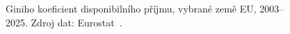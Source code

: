 \def\strEuGiniPrijemTitle{Giniho koeficient příjmové nerovnosti}%
\def\strEuGiniPrijemYlabel{Giniho koeficient [0--100]}%
\def\strEuGiniPrijemCaption{Giniho koeficient disponibilního příjmu, vybrané země \acs{EU}, 2003--2025. Zdroj dat: Eurostat~\cite{eurostat_ilc_di12_Gini}.}%
%

\providecommand\NudgeEuGiniPrijemCz{0pt}%
\providecommand\NudgeEuGiniPrijemAt{-4pt}%
\providecommand\NudgeEuGiniPrijemDe{0pt}%
\providecommand\NudgeEuGiniPrijemDk{0pt}%
\providecommand\NudgeEuGiniPrijemPl{1pt}%
\providecommand\NudgeEuGiniPrijemSk{0pt}%
\begin{figure}[htbp]
  \centering
  
  \caption{\strEuGiniPrijemCaption}
  \label{fig:eu_gini_prijem}
\end{figure}
